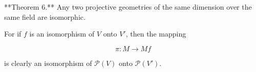 **Theorem 6.** Any two projective geometries of the same dimension over the same field are isomorphic.

For if $f$ is an isomorphism of $V$ onto $V'$, then the mapping

$$\pi: M \rightarrow Mf$$

is clearly an isomorphism of $\mathcal{P}(V)$ onto $\mathcal{P}(V')$.
